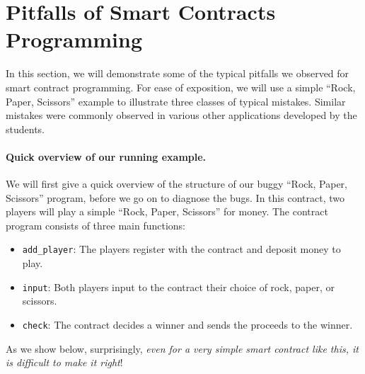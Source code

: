 \documentclass[10pt,twocolumn,letterpaper]{article}
\newcommand{\elaine}[1]{{\color{red}{[elaine: #1]}}}
\newcommand{\ignore}[1]{}
\begin{document}
\section{Pitfalls of Smart Contracts Programming}
In this section, we will demonstrate some of the typical pitfalls
we observed for smart contract programming. 
For ease of exposition, we will use
a simple ``Rock, Paper, Scissors''  
example to illustrate three classes of typical mistakes.
Similar mistakes 
were commonly observed in various other 
applications developed by the students.  

\paragraph{Quick overview of our running example.}
We will first give a quick overview of the structure
of our buggy ``Rock, Paper, Scissors'' program, before
we go on to diagnose the bugs.
In this contract, two players 
will play a simple 
``Rock, Paper, Scissors''
for money. 
The contract program consists of three main functions:
\begin{itemize}
\item
{\tt add\_player}:
The players register with the contract
and deposit money to play.
\item
{\tt input}:
Both players input to the contract 
their choice of rock, paper, or scissors.
\item
{\tt check}:
The contract decides a winner
and sends the proceeds to the winner. 
\end{itemize}

As we show below, 
surprisingly, {\it even for a very simple smart contract like this, 
it is difficult 
to make it right}!

\elaine{emphasize this in the intro too.}


\ignore{
In this section, we'll explore the security and incentive alignment pitfalls in designing a smart contract. We'll use an easy-to-understand application as a running example, based on a Rock-Paper-Scissors game. We then analyze a plausible (but subtly buggy) initial implementation, pointing out its flaws. Mistakes resembling these were actually observed in our Smart Contract Programming Lab in ``CMSC 414 - Undergraduate Security''. vThis section is centered around the exercises. We provide hints to guide the reader towards discovering how to improve on them. Our ``reference'' solution can be found in the accompanying materials.
}
\end{document}
